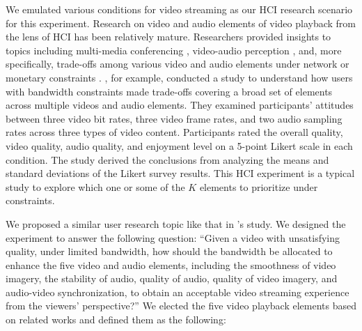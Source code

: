 We emulated various conditions for video streaming as our HCI research scenario for this experiment. Research on video and audio elements of video playback from the lens of HCI has been relatively mature. Researchers provided insights to topics including multi-media conferencing \cite{watson1996evaluating}, video-audio perception \cite{chen2006cognitive, molnar2015assessing}, and, more specifically, trade-offs among various video and audio elements under network or monetary constraints \cite{molnar2013comedy, oeldorf2012bad}. \textcite{oeldorf2012bad}, for example, conducted a study to understand how users with bandwidth constraints made trade-offs covering a broad set of elements across multiple videos and audio elements. They examined participants' attitudes between three video bit rates, three video frame rates, and two audio sampling rates across three types of video content. Participants rated the overall quality, video quality, audio quality, and enjoyment level on a 5-point Likert scale in each condition. The study derived the conclusions from analyzing the means and standard deviations of the Likert survey results. This HCI experiment is a typical study to explore which one or some of the $K$ elements to prioritize under constraints.

We proposed a similar user research topic like that in \textcite{oeldorf2012bad}'s study. We designed the experiment to answer the following question: ``Given a video with unsatisfying quality, under limited bandwidth, how should the bandwidth be allocated to enhance the five video and audio elements, including the smoothness of video imagery, the stability of audio, quality of audio, quality of video imagery, and audio-video synchronization, to obtain an acceptable video streaming experience from the viewers' perspective?'' We elected the five video playback elements based on related works and defined them as the following: 

